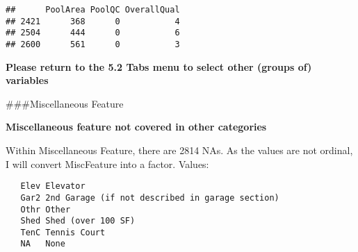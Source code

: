 \documentclass[]{article}
\newenvironment{Shaded}{\begin{snugshade}}{\end{snugshade}}
\newcommand{\DecValTok}[1]{\textcolor[rgb]{0.00,0.00,0.81}{#1}}
\newcommand{\KeywordTok}[1]{\textcolor[rgb]{0.13,0.29,0.53}{\textbf{#1}}}
\newcommand{\NormalTok}[1]{#1}
\newcommand{\OperatorTok}[1]{\textcolor[rgb]{0.81,0.36,0.00}{\textbf{#1}}}
\newcommand{\StringTok}[1]{\textcolor[rgb]{0.31,0.60,0.02}{#1}}
\begin{document}
\begin{Shaded}
\end{Shaded}

\begin{verbatim}
##      PoolArea PoolQC OverallQual
## 2421      368      0           4
## 2504      444      0           6
## 2600      561      0           3
\end{verbatim}

\begin{Shaded}
\end{Shaded}

\textbf{Please return to the 5.2 Tabs menu to select other (groups of)
variables}

\#\#\#Miscellaneous Feature

\textbf{Miscellaneous feature not covered in other categories}

Within Miscellaneous Feature, there are 2814 NAs. As the values are not
ordinal, I will convert MiscFeature into a factor. Values:

\begin{verbatim}
   Elev Elevator
   Gar2 2nd Garage (if not described in garage section)
   Othr Other
   Shed Shed (over 100 SF)
   TenC Tennis Court
   NA   None
\end{verbatim}
\end{document}

